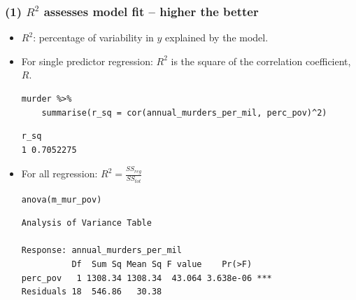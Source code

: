 \documentclass[slidestop,compress,mathserif,12pt,t,professionalfonts,xcolor=table]{beamer}
\begin{document}
\begin{frame}[fragile]
\frametitle{(1) $R^2$ assesses model fit -- higher the better}

\begin{itemize}

\item $R^2$: percentage of variability in $y$ explained by the model.

\pause

\item For single predictor regression: $R^2$ is the square of the correlation coefficient, $R$.
{\tiny
\begin{Verbatim}[frame=single, formatcom=\color{blue}]
murder %>%
    summarise(r_sq = cor(annual_murders_per_mil, perc_pov)^2)
\end{Verbatim}
}
{\tiny
\begin{Verbatim}[frame=single, formatcom=\color{gray}]
       r_sq
1 0.7052275
\end{Verbatim}
}

\pause

\item For all regression: $R^2 = \frac{SS_{reg}}{SS_{tot}}$

{\tiny
\begin{Verbatim}[frame=single, formatcom=\color{blue}]
anova(m_mur_pov)
\end{Verbatim}
}

{\tiny
\begin{Verbatim}[frame=single, formatcom=\color{gray}]
Analysis of Variance Table

Response: annual_murders_per_mil
          Df  Sum Sq Mean Sq F value    Pr(>F)    
perc_pov   1 1308.34 1308.34  43.064 3.638e-06 ***
Residuals 18  546.86   30.38  
\end{Verbatim}
}

\end{itemize}





\end{frame}
\end{document}
